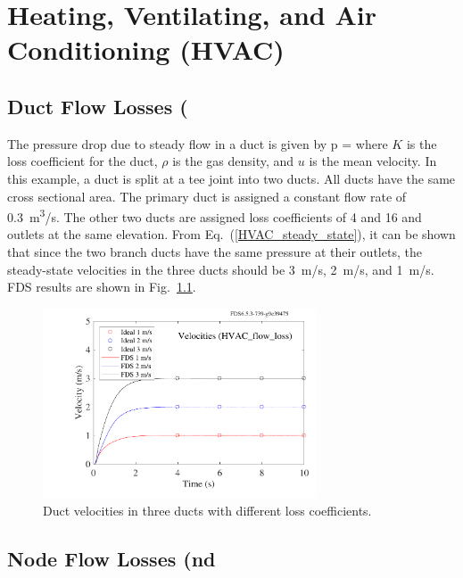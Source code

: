 \documentclass[11pt]{book}
\begin{document}
\clearpage

\newpage


\chapter{Heating, Ventilating, and Air Conditioning (HVAC)}

\section{Duct Flow Losses (\texorpdfstring{})}
\label{HVAC_flow_loss}

The pressure drop due to steady flow in a duct is given by
\be \Delta p =   \label {HVAC_steady_state}\ee
where $K$ is the loss coefficient for the duct, $\rho$ is the gas density, and $u$ is the mean velocity. In this example, a duct is split at a tee joint into two ducts. All ducts have the same cross sectional area.  The primary duct is assigned a constant flow rate of 0.3~\si{m^3/s}.  The other two ducts are assigned loss coefficients of 4 and 16 and outlets at the same elevation.  From Eq.~(\ref{HVAC_steady_state}), it can be shown that since the two branch ducts have the same pressure at their outlets, the steady-state velocities in the three ducts should be 3~m/s, 2~m/s, and 1~m/s.  FDS results are shown in Fig.~\ref{fig_HVAC_loss}.

\begin{figure}[ht]
   \begin{center}
      \includegraphics[width=3.2in]{SCRIPT_FIGURES/HVAC_flow_loss}
     \caption[The  test case]{\label{fig_HVAC_loss} Duct velocities in three ducts with different loss coefficients.}
   \end{center}
\end{figure}

\clearpage

\section{Node Flow Losses (\texorpdfstring{} and \texorpdfstring{})}
\end{document}
